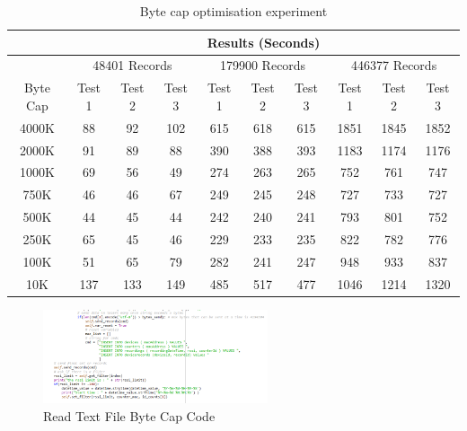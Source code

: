 \documentclass{report}
\begin{document}
\begin{table}[h!]
    \centering
    \begin{tabular}{|c|c|c|c|c|c|c|c|c|c|}
    \hline
             & \multicolumn{9}{|c|}{Results (Seconds)} \\ 
        \hline
         & \multicolumn{3}{|c|}{48401 Records} & \multicolumn{3}{|c|}{179900 Records} & \multicolumn{3}{|c|}{446377 Records} \\
    \hline
        Byte Cap & Test 1 & Test 2 & Test 3 &  Test 1 & Test 2 & Test 3 & \vline Test 1 & Test 2 & Test 3 \\
    \hline
        4000K &  88 & 92 & 102 & 615 & 618 & 615 & 1851 & 1845 & 1852 \\
        2000K &  91 & 89 & 88 & 390 & 388 & 393 & 1183 & 1174 & 1176 \\
        1000K & 69 & 56 & 49 & 274 & 263 & 265 & 752 & 761 & 747\\
        750K & 46 & 46 & 67 & 249 & 245 & 248 & 727 & 733 & 727 \\
        500K &  44 & 45 & 44 & 242 & 240 & 241 & 793 & 801 & 752 \\
        250K & 65 & 45 & 46 & 229 & 233 & 235 & 822 & 782 & 776\\
        100K & 51 & 65 & 79 & 282 & 241 & 247 & 948 & 933 & 837\\
        10K & 137 & 133 & 149 & 485 & 517 & 477 & 1046 & 1214 & 1320 \\
        \hline
    \end{tabular}
    \caption{Byte cap optimisation experiment}
    \label{tab:Byte cap optimisation}
\end{table} 
\begin{figure}[h!]
    \centering
    \includegraphics[width=250]{read_text_file_byte_cap.PNG}
    \caption{Read Text File Byte Cap Code}
    \label{fig:byte_cap_read}
\end{figure}{} \\
\end{document}
